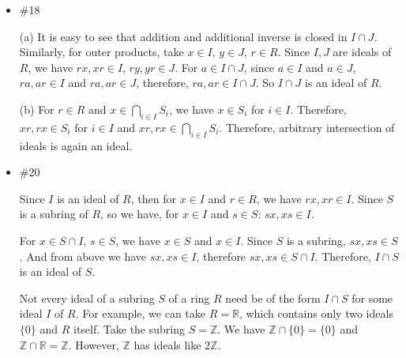 \documentclass[12pt]{article}
\newcommand{\Z}{\mathbb{Z}}
\begin{document}
\begin{enumerate}
\begin{itemize}
\newpage
\item \#18

 (a) It is easy to see that addition and additional inverse is closed in $I \cap J$. Similarly, for outer products, take $x \in I$, $y \in J$, $r \in R$. Since $I,J$ are ideals of $R$, we have $rx, xr \in I$, $ry, yr \in J$. For $a \in I \cap J$, since $a\in I$ and $a\in J$, $ra, ar \in I$ and $ra, ar \in J$, therefore, $ra, ar \in I \cap J$. So $I \cap J$ is an ideal of $R$.

\noindent(b) For $r \in R$ and $x \in \bigcap\limits_{i \in I} S_i$, we have $x \in S_i$ for $i \in I$. Therefore, $xr, rx \in S_i$ for $i \in I$ and $xr, rx \in \bigcap\limits_{i\in I} S_i$. Therefore, arbitrary intersection of ideals is again an ideal.

\newpage
\item \#20

 Since $I$ is an ideal of $R$, then for $x \in I$ and $r \in R$, we have $rx, xr \in I$. Since $S$ is a subring of $R$, so we have, for $x\in I$ and $s \in S$: $sx, xs \in I$.

For $x \in S \cap I$, $s \in S$, we have $x\in S$ and $x \in I$. Since $S$ is a subring, $sx, xs \in S$. And from above we have $sx, xs \in I$, therefore $sx, xs \in S\cap I$. Therefore, $I \cap S$ is an ideal of $S$.

Not every ideal of a subring $S$ of a ring $R$ need be of the form $I \cap S$ for some ideal $I$ of $R$. For example, we can take $R = \mathbb R$, which contains only two ideals $\{0\}$ and $R$ itself. Take the subring $S = \Z$. We have $\Z \cap \{0\} = \{0\}$ and $\Z \cap \mathbb R = \Z$. However, $\Z$ has ideals like $2 \Z$.
\end{itemize}
\end{enumerate}
\end{document}

